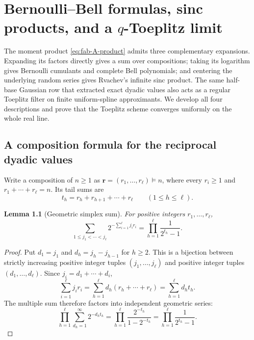 \documentclass[11pt,oneside,openany]{book}
\newtheorem{lemma}[theorem]{Lemma}
\theoremstyle{definition}
\theoremstyle{remark}
\begin{document}
\chapter{Bernoulli--Bell formulas, sinc products, and a \texorpdfstring{$q$}{q}-Toeplitz limit}
\label{chap:fabius-bernoulli-toeplitz}

The moment product \eqref{eq:fab-A-product} admits three complementary
expansions.  Expanding its factors directly gives a sum over compositions;
taking its logarithm gives Bernoulli cumulants and complete Bell
polynomials; and centering the underlying random series gives Rvachev's
infinite sinc product.  The same half-base Gaussian row that extracted exact
dyadic values also acts as a regular Toeplitz filter on finite uniform-spline
approximants.  We develop all four descriptions and prove that the Toeplitz
scheme converges uniformly on the whole real line.

\section{A composition formula for the reciprocal dyadic values}

Write a composition of $n\ge1$ as
$\boldsymbol r=(r_1,\ldots,r_\ell)\vDash n$, where every $r_i\ge1$ and
$r_1+\cdots+r_\ell=n$.  Its tail sums are
\[
 t_h=r_h+r_{h+1}+\cdots+r_\ell\qquad(1\le h\le\ell).
\]

\begin{lemma}[Geometric simplex sum]
\label{lem:fab-geometric-simplex}
For positive integers $r_1,\ldots,r_\ell$,
\begin{equation}
 \sum_{1\le j_1<\cdots<j_\ell}
 2^{-\sum_{i=1}^{\ell}j_ir_i}
 =\prod_{h=1}^{\ell}\frac1{2^{t_h}-1}.
 \label{eq:fab-geometric-simplex}
\end{equation}
\end{lemma}

\begin{proof}
Put $d_1=j_1$ and $d_h=j_h-j_{h-1}$ for $h\ge2$.  This is a bijection
between strictly increasing positive integer tuples $(j_1,\ldots,j_\ell)$
and positive integer tuples $(d_1,\ldots,d_\ell)$.  Since
$j_i=d_1+\cdots+d_i$,
\[
 \sum_{i=1}^{\ell}j_ir_i
 =\sum_{h=1}^{\ell}d_h(r_h+\cdots+r_\ell)
 =\sum_{h=1}^{\ell}d_ht_h.
\]
The multiple sum therefore factors into independent geometric series:
\[
 \prod_{h=1}^{\ell}\sum_{d_h=1}^{\infty}2^{-d_ht_h}
 =\prod_{h=1}^{\ell}\frac{2^{-t_h}}{1-2^{-t_h}}
 =\prod_{h=1}^{\ell}\frac1{2^{t_h}-1}.
\]
\end{proof}
\end{document}
